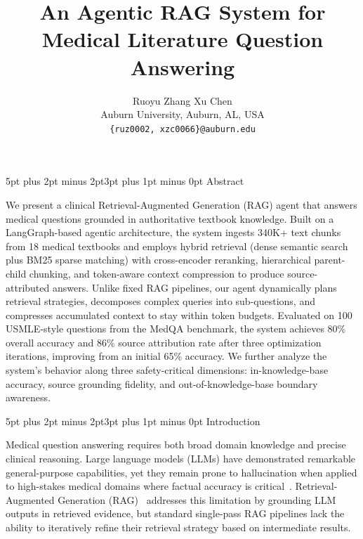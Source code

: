 \documentclass[10pt,twocolumn,letterpaper]{article}
\makeatletter
\renewcommand\section{\@startsection{section}{1}{\z@}%
  {5pt plus 2pt minus 2pt}{3pt plus 1pt minus 0pt}%
  {\large\bfseries}}
\makeatother
\begin{document}
\title{An Agentic RAG System for Medical Literature Question Answering}
\author{Ruoyu Zhang \quad Xu Chen\\
Auburn University, Auburn, AL, USA\\
{\tt\small \{ruz0002, xzc0066\}@auburn.edu}
}
\maketitle

\vspace{-2pt}
\section{Abstract}

We present a clinical Retrieval-Augmented Generation (RAG) agent that answers medical questions grounded in authoritative textbook knowledge. Built on a LangGraph-based agentic architecture, the system ingests 340K+ text chunks from 18 medical textbooks and employs hybrid retrieval (dense semantic search plus BM25 sparse matching) with cross-encoder reranking, hierarchical parent-child chunking, and token-aware context compression to produce source-attributed answers. Unlike fixed RAG pipelines, our agent dynamically plans retrieval strategies, decomposes complex queries into sub-questions, and compresses accumulated context to stay within token budgets. Evaluated on 100 USMLE-style questions from the MedQA benchmark, the system achieves 80\% overall accuracy and 86\% source attribution rate after three optimization iterations, improving from an initial 65\% accuracy. We further analyze the system's behavior along three safety-critical dimensions: in-knowledge-base accuracy, source grounding fidelity, and out-of-knowledge-base boundary awareness.

\section{Introduction}

Medical question answering requires both broad domain knowledge and precise clinical reasoning. Large language models (LLMs) have demonstrated remarkable general-purpose capabilities, yet they remain prone to hallucination when applied to high-stakes medical domains where factual accuracy is critical~\cite{ji2023survey}. Retrieval-Augmented Generation (RAG)~\cite{lewis2020retrieval} addresses this limitation by grounding LLM outputs in retrieved evidence, but standard single-pass RAG pipelines lack the ability to iteratively refine their retrieval strategy based on intermediate results.
\end{document}
